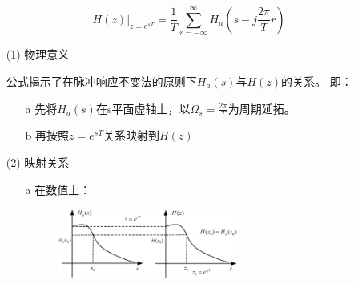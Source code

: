 \documentclass[notheorems,compress,mathserif,table]{beamer}
\begin{document}
\begin{frame}[shrink]\frametitle{}%
$$H(z)|_{z=e^{sT}}=  \frac{1}{T}\sum_{r=-\infty}^{\infty}H_a(s-j\frac{2\pi}{T}r)$$
      \begin{enumerate}
        \item [(1)] 物理意义\par

              公式揭示了在脉冲响应不变法的原则下$H_a(s)$与$H(z)$的关系。
              即：
              \begin{enumerate}
                \item[a] 先将$H_a(s)$在s平面虚轴上，以$\Omega_s = \frac{2\pi}{T}$为周期延拓。
                \item[b] 再按照$z=e^{sT}$关系映射到$H(z)$
              \end{enumerate}
        \item [(2)] 映射关系
        \begin{enumerate}
          \item [a]在数值上：
            \begin{figure}[h]
               \centering
               \includegraphics[width=0.6\textwidth]{fig13_MZshuzhiduiying.jpg}
             \end{figure}
       \end{enumerate}
\end{enumerate}
\end{frame}
%
%
\end{document}
